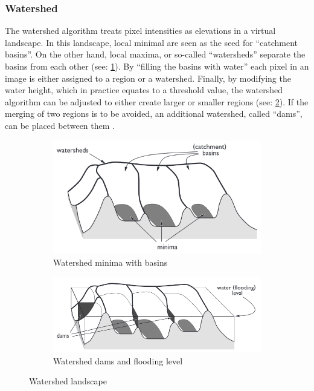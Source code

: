 \subsubsection{Watershed}
The watershed algorithm treats pixel intensities as elevations in a virtual landscape.
In this landscape, local minimal are seen as the seed for ``catchment basins''.
On the other hand, local maxima, or so-called ``watersheds'' separate the basins from each other (see: \cref{fig:water1}).
By ``filling the basins with water'' each pixel in an image is either assigned to a region or a watershed.
Finally, by modifying the water height, which in practice equates to a threshold value,
the watershed algorithm can be adjusted to either create larger or smaller regions (see: \cref{fig:water2}).
If the merging of two regions is to be avoided, an additional watershed, called ``dams'',
can be placed between them \cite{preimImageAnalysisMedical2014,hahnIWTinteractiveWatershedTransform2003}.
\begin{figure}[h!]
	\begin{subfigure}{0.49\textwidth}
		\centerline{
			\includegraphics[scale=0.5]{images/watershed1.png}}
		\caption{Watershed minima with basins \cite{hahnIWTinteractiveWatershedTransform2003}}\label{fig:water1}
	\end{subfigure}
	\begin{subfigure}{0.49\textwidth}
		\centerline{
			\includegraphics[scale=0.5]{images/watershed2.png}}
		\caption{Watershed dams and flooding level \cite{hahnIWTinteractiveWatershedTransform2003}}\label{fig:water2}
	\end{subfigure}
	\caption{Watershed landscape}\label{fig:watershed}
\end{figure}


